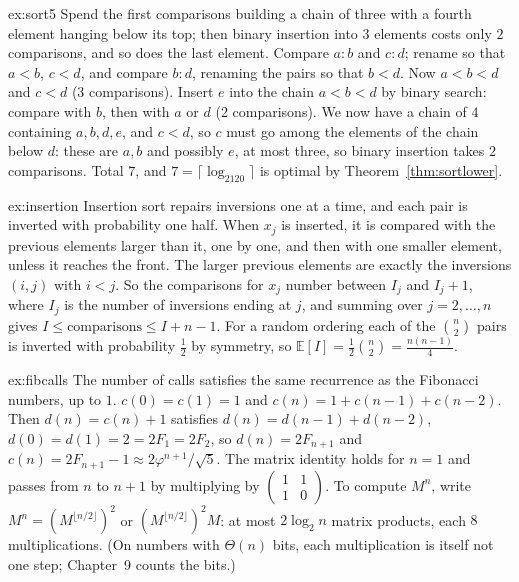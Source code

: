 \begin{solution}{ex:sort5}
\idea Spend the first comparisons building a chain of three with a fourth element hanging below its top; then binary insertion into $3$ elements
costs only $2$ comparisons, and so does the last element.
\writeup Compare $a:b$ and $c:d$; rename so that $a<b$, $c<d$, and compare $b:d$, renaming the pairs so that $b<d$. Now $a<b<d$ and $c<d$ ($3$ comparisons).
Insert $e$ into the chain $a<b<d$ by binary search: compare with $b$, then with $a$ or $d$ ($2$ comparisons). We now have a chain of $4$ containing
$a,b,d,e$, and $c<d$, so $c$ must go among the elements of the chain below $d$: these are $a,b$ and possibly $e$, at most three, so binary
insertion takes $2$ comparisons. Total $7$, and $7=\lceil\log_2120\rceil$ is optimal by Theorem~\ref{thm:sortlower}.
\end{solution}

\begin{solution}{ex:insertion}
\idea Insertion sort repairs inversions one at a time, and each pair is inverted with probability one half.
\writeup When $x_j$ is inserted, it is compared with the previous elements larger than it, one by one, and then with one smaller element, unless
it reaches the front. The larger previous elements are exactly the inversions $(i,j)$ with $i<j$. So the comparisons for $x_j$ number between
$I_j$ and $I_j+1$, where $I_j$ is the number of inversions ending at $j$, and summing over $j=2,\dots,n$ gives $I\le\text{comparisons}\le I+n-1$. For a
random ordering each of the $\binom n2$ pairs is inverted with probability $\frac12$ by symmetry, so $\mathbb E[I]=\frac12\binom n2=\frac{n(n-1)}4$.
\end{solution}

\begin{solution}{ex:fibcalls}
\idea The number of calls satisfies the same recurrence as the Fibonacci numbers, up to $1$.
\writeup $c(0)=c(1)=1$ and $c(n)=1+c(n-1)+c(n-2)$. Then $d(n)=c(n)+1$ satisfies $d(n)=d(n-1)+d(n-2)$, $d(0)=d(1)=2=2F_1=2F_2$, so $d(n)=2F_{n+1}$ and
$c(n)=2F_{n+1}-1\approx2\varphi^{n+1}/\sqrt5$. The matrix identity holds for $n=1$ and passes from $n$ to $n+1$ by multiplying by
$\left(\begin{smallmatrix}1&1\\1&0\end{smallmatrix}\right)$. To compute $M^n$, write $M^n=(M^{\lfloor n/2\rfloor})^2$ or $(M^{\lfloor n/2\rfloor})^2M$: at most
$2\log_2n$ matrix products, each $8$ multiplications. (On numbers with $\Theta(n)$ bits, each multiplication is itself not one step; Chapter~9
counts the bits.)
\end{solution}

